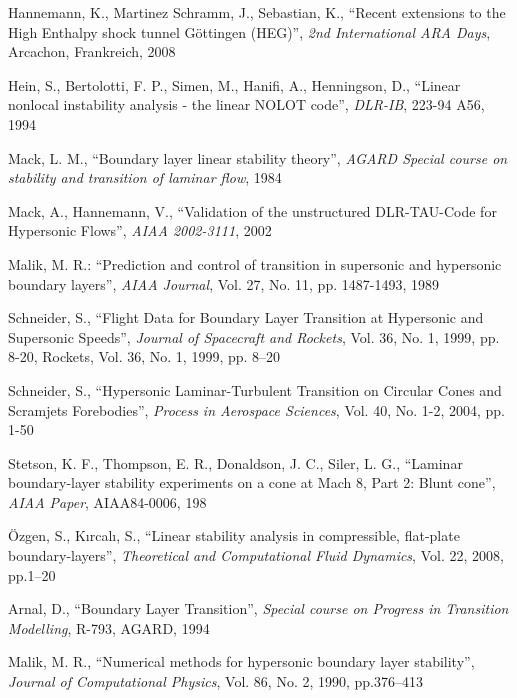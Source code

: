 \documentclass[]{aiaa-tc}%
\begin{document}

\begin{thebibliography}{33}

Hannemann, K., Martinez Schramm, J., Sebastian, K., ``Recent extensions to the High Enthalpy shock tunnel Göttingen (HEG)'', \textit{2nd International ARA Days}, Arcachon, Frankreich, 2008

Hein, S., Bertolotti, F. P.,  Simen, M., Hanifi, A., Henningson, D., ``Linear nonlocal instability analysis - the linear NOLOT code'',  \textit{DLR-IB}, 223-94 A56, 1994

Mack, L. M., ``Boundary layer linear stability theory'', \textit{AGARD Special course on stability and transition of laminar flow},  1984

Mack, A., Hannemann, V., ``Validation of the unstructured DLR-TAU-Code for Hypersonic Flows'', \textit{AIAA 2002-3111}, 2002

Malik, M. R.: ``Prediction and control of transition in supersonic and hypersonic boundary layers'', \textit{AIAA Journal}, Vol. 27, No. 11, pp. 1487-1493, 1989

Schneider, S., ``Flight Data for Boundary Layer Transition at Hypersonic and Supersonic Speeds'', \textit{Journal of Spacecraft and Rockets}, Vol. 36, No. 1, 1999, pp. 8-20, Rockets, Vol. 36, No. 1, 1999, pp. 8–20

Schneider, S., ``Hypersonic Laminar-Turbulent Transition on Circular Cones and Scramjets Forebodies'', \textit{Process in Aerospace Sciences}, Vol. 40, No. 1-2, 2004, pp. 1-50

Stetson, K. F., Thompson, E. R., Donaldson, J. C., Siler, L. G., ``Laminar boundary-layer stability experiments on a cone at Mach 8, Part 2: Blunt cone'', \textit{AIAA Paper}, AIAA84-0006, 198

  \"{O}zgen, S.,  K{\i}rcal{\i}, S., ``Linear stability analysis in compressible, flat-plate boundary-layers'', \textit{Theoretical and Computational Fluid Dynamics}, Vol. 22, 2008, pp.1--20
  
Arnal, D., ``Boundary Layer Transition'',   \textit{Special course on Progress in Transition Modelling}, R-793, AGARD, 1994

  Malik, M. R., ``Numerical methods for hypersonic boundary layer stability'',
 \textit{Journal of Computational Physics}, Vol. 86, No. 2, 1990, pp.376--413

\end{thebibliography}
\end{document}

